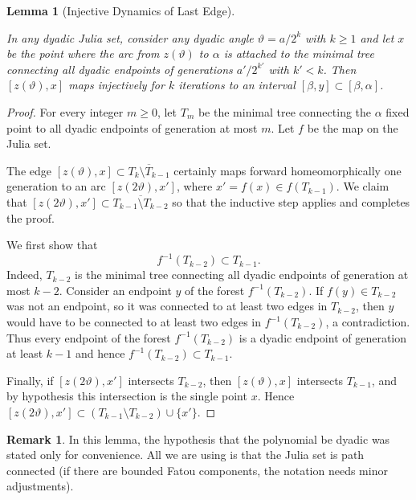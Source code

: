 \documentclass[12pt]{amsart}
\newcommand{\sm}{\setminus}
\newcommand{\0}{\texttt{0}}
\newcommand{\1}{\texttt{1}}
\newtheorem{lemma}[theorem]{Lemma}
\theoremstyle{definition}
\newtheorem*{remark}{Remark}
\numberwithin{equation}{section}
\renewcommand{\theta}{\vartheta}
\newcommand{\ovl}[1]{\overline{#1}}
\newcommand{\lineclear}{\rule{0pt}{2pt}\newline}
\begin{document}

\begin{lemma}[Injective Dynamics of Last Edge]
\label{Lem:InjectiveDynamicsLastEdge} \lineclear
In any dyadic Julia set, consider any dyadic angle $\theta=a/2^k$ with $k\ge 1$ and let  $x$ be the point where the arc from $z(\theta)$ to $\alpha$ is attached to the minimal tree connecting all dyadic endpoints of generations $a'/2^{k'}$ with $k'<k$. Then $[z(\theta),x]$ maps injectively for $k$ iterations to an interval $[\beta,y]\subset[\beta,\alpha]$. 
\end{lemma}
\begin{proof}
For every integer $m\ge 0$, let $T_m$ be the minimal tree connecting the $\alpha$ fixed point to all dyadic endpoints of generation at most $m$. Let $f$ be the map on the Julia set. 

The edge $[z(\theta),x]\subset \ovl{T_k\sm T_{k-1}}$ certainly maps forward homeomorphically one generation to an arc $[z(2\theta),x']$, where $x'=f(x)\in f(T_{k-1})$. 
We claim that $[z(2\theta),x']\subset \ovl{T_{k-1}\sm T_{k-2}}$ so that the inductive step applies and completes the proof. 

We first show that 
\begin{equation}
\label{eq:T_k-2InT_k-1}f^{-1}(T_{k-2})\subset T_{k-1}.
\end{equation} 
Indeed, $T_{k-2}$ is the minimal tree connecting all dyadic endpoints of generation at most $k-2$. Consider an endpoint $y$ of the forest $f^{-1}(T_{k-2})$. If $f(y)\in T_{k-2}$ was not an endpoint, so it was connected to  at least two edges in $T_{k-2}$, then $y$ would have to be connected to at least two edges in $f^{-1}(T_{k-2})$, a contradiction. Thus every endpoint of the forest $f^{-1}(T_{k-2})$ is a dyadic endpoint of generation at least $k-1$ and hence $f^{-1}(T_{k-2})\subset T_{k-1}$.

Finally, if $[z(2\theta),x']$ intersects $T_{k-2}$, then $[z(\theta),x]$ intersects $T_{k-1}$, and by hypothesis this intersection is the single point $x$. Hence $[z(2\theta),x']\subset (T_{k-1}\sm T_{k-2})\cup\{x'\}$.
\end{proof}

\begin{remark}
In this lemma, the hypothesis that the polynomial be dyadic was stated only for convenience. All we are using is that the Julia set is path connected (if there are bounded Fatou components, the notation needs minor adjustments). 
\end{remark}
\end{document}
